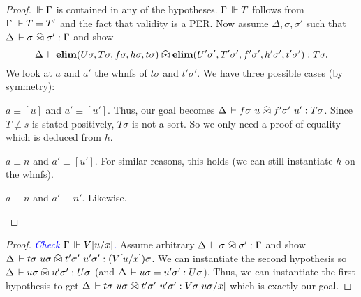 \documentclass[a4paper,english]{lipics-utf8x}
\newcommand\meta[1]{\noindent\textcolor{blue}{\emph{#1}}}
\begin{document}
  \begin{proof}
    $\,\Vdash \Gamma$ is contained in any of the hypotheses.
    $\Gamma \,\Vdash T$ follows from $\Gamma \,\Vdash T = T'$ and the fact that validity
    is a PER.
    Now assume $\Delta, \sigma, \sigma'$ such that
    $\Delta \,\vdash \sigma \mathrel{\widehat{\bowtie}} \sigma' : \Gamma$ and
    show
    \[\Delta \,\vdash \operatorname{\mathbf{elim}}(U \sigma,T \sigma,f \sigma,h \sigma,t \sigma) \mathrel{\widehat{\bowtie}}
    \operatorname{\mathbf{elim}}(U' \sigma',T' \sigma',f' \sigma',h' \sigma',t' \sigma') : T \sigma.\]
    We look at $a$ and $a'$ the whnfs of $t \sigma$ and $t' \sigma'$.
    We have three possible cases (by symmetry):
    \begin{caselist}
      \nextcase $a \equiv [u]$ and $a' \equiv [u']$.
      Thus, our goal becomes
      $\Delta \der f \sigma\ u \hEr f' \sigma'\ u' : T \sigma$.
      Since $T \nequiv s$ is stated positively, $T \sigma$ is not a
      sort. So we only need a proof of equality which is deduced from $h$.

      \nextcase $a \equiv n$ and $a' \equiv [u']$.
      For similar reasons, this holds (we can still instantiate $h$ on the
      whnfs).

      \nextcase $a \equiv n$ and $a' \equiv n'$.
      Likewise.
    \end{caselist}
  \end{proof}

  \begin{lemma}
    \leavevmode
    \begin{mathc}
    \end{mathc}
  \end{lemma}

  \begin{proof}
    \meta{Check $\Gamma \,\Vdash V[u/x]$.}
    Assume arbitrary $\Delta \,\vdash \sigma \mathrel{\widehat{\bowtie}} \sigma' : \Gamma$ and show
    $\Delta \der t\sigma\ u\sigma \hEr t'\sigma'\ u'\sigma' : (V[u/x])\sigma$.
    We can instantiate the second hypothesis so
    $\Delta \,\vdash u \sigma \mathrel{\widehat{\bowtie}} u' \sigma' : U \sigma$
    (and $\Delta \,\vdash u \sigma = u' \sigma' : U \sigma$).
    Thus, we can instantiate the first hypothesis to get
    $\Delta \,\vdash t \sigma\ u \sigma \mathrel{\widehat{\bowtie}} t' \sigma'\ u' \sigma' :
    V\sigma[u\sigma/x]$ which is exactly our goal.
  \end{proof}

  \begin{lemma}
    \leavevmode
    \begin{mathc}
    \end{mathc}
  \end{lemma}
\end{document}
